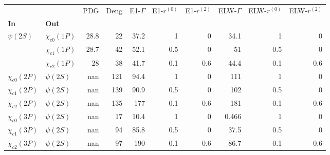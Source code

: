 \begin{tabular}{l|l|r|r|r|r|r|r|r|r}
\toprule
                &            &  PDG &  Deng &  E1-$\Gamma$ &  E1-$r^{(0)}$ &  E1-$r^{(2)}$ &  ELW-$\Gamma$ &  ELW-$r^{(0)}$ &  ELW-$r^{(2)}$ \\
\textbf{In} & \textbf{Out} &      &       &              &               &               &               &                &                \\
\midrule
\textbf{$\psi(2S)$} & \textbf{$\chi_{c0}(1P)$} & 28.8 &    22 &         37.2 &             1 &             0 &          34.1 &              1 &              0 \\
                & \textbf{$\chi_{c1}(1P)$} & 28.7 &    42 &         52.1 &           0.5 &             0 &            51 &            0.5 &              0 \\
                & \textbf{$\chi_{c2}(1P)$} &   28 &    38 &         41.7 &           0.1 &           0.6 &          44.4 &            0.1 &            0.6 \\
\textbf{$\chi_{c0}(2P)$} & \textbf{$\psi(2S)$} &  nan &   121 &         94.4 &             1 &             0 &           111 &              1 &              0 \\
\textbf{$\chi_{c1}(2P)$} & \textbf{$\psi(2S)$} &  nan &   139 &         90.9 &           0.5 &             0 &           102 &            0.5 &              0 \\
\textbf{$\chi_{c2}(2P)$} & \textbf{$\psi(2S)$} &  nan &   135 &          177 &           0.1 &           0.6 &           181 &            0.1 &            0.6 \\
\textbf{$\chi_{c0}(3P)$} & \textbf{$\psi(2S)$} &  nan &    17 &         10.4 &             1 &             0 &         0.466 &              1 &              0 \\
\textbf{$\chi_{c1}(3P)$} & \textbf{$\psi(2S)$} &  nan &    94 &         85.8 &           0.5 &             0 &          37.5 &            0.5 &              0 \\
\textbf{$\chi_{c2}(3P)$} & \textbf{$\psi(2S)$} &  nan &    97 &          190 &           0.1 &           0.6 &          86.7 &            0.1 &            0.6 \\
\bottomrule
\end{tabular}
